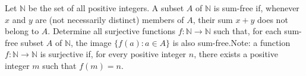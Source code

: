 Let $\mathbb N$ be the set of all positive integers. A subset $A$ of $\mathbb N$ is sum-free if, whenever $x$ and $y$ are (not necessarily distinct) members of $A$,   their sum $x+y$ does not belong to $A$. Determine all surjective functions $f:\mathbb N\to\mathbb N$ such that, for each sum-free subset $A$ of $\mathbb N$,  the image $\{f(a):a\in A\}$ is also sum-free.Note: a function $f:\mathbb N\to\mathbb N$ is surjective if, for every positive integer $n$,  there exists a positive integer $m$ such that $f(m)=n$.